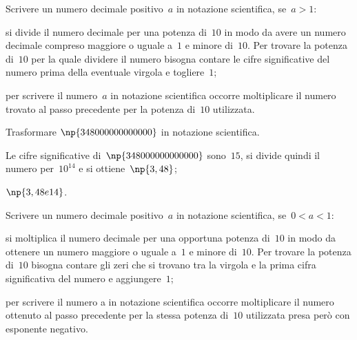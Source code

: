 \begin{procedura}
Scrivere un numero decimale positivo~$a$ in notazione scientifica, se~$a>1$:
\begin{enumeratea}
 \item si divide il numero decimale per una potenza di~$10$ in modo da avere un numero decimale compreso maggiore o uguale a~$1$ e minore di~$10$. Per trovare la potenza di~$10$ per la quale dividere il numero bisogna contare le cifre significative
del numero prima della eventuale virgola e togliere~$1$;
 \item per scrivere il numero~$a$ in notazione scientifica occorre moltiplicare il numero trovato al passo
precedente per la potenza di~$10$ utilizzata.
\end{enumeratea}
\end{procedura}

\begin{exrig}
 \begin{esempio}
Trasformare $\np{348000000000000}$ in notazione scientifica.
\begin{enumeratea}
\item Le cifre significative di~$\np{348000000000000}$ sono~$15$,
si divide quindi il numero per~$10^{14}$ e si ottiene~$\np{3,48}$;
\item $\np{3,48e14}$.
\end{enumeratea}
 \end{esempio}
\end{exrig}

\begin{procedura}
Scrivere un numero decimale positivo~$a$ in notazione scientifica, se~$0<a<1$:
\begin{enumeratea}
 \item si moltiplica il numero decimale per una opportuna potenza di~$10$ in modo da ottenere un numero maggiore o uguale a~$1$ e minore di~$10$. Per trovare la potenza di~$10$ bisogna contare gli zeri che si trovano tra la virgola e la prima cifra
significativa del numero e aggiungere~$1$;
 \item per scrivere il numero a in notazione scientifica occorre moltiplicare il numero ottenuto al passo
precedente per la stessa
potenza di~$10$ utilizzata presa però con esponente negativo.
\end{enumeratea}
\end{procedura}

